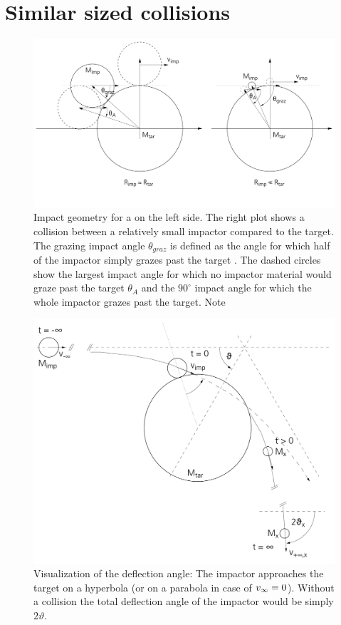 \newpage
\chapter{Similar sized collisions}
\graphicspath{{./03figs/}}


\begin{figure}[htbp]
\begin{center}
\includegraphics[scale=0.4]{03_grazing}
\caption{Impact geometry for a \SSC on the left side. The right plot shows a collision between a relatively small impactor compared to the target. The grazing impact angle $\theta_{graz}$ is defined as the angle for which half of the impactor simply grazes past the target \citep{Asphaug:2010p3539}. The dashed circles show the largest impact angle for which no impactor material would graze past the target $\theta_A$ and the $90^\circ$ impact angle for which the whole impactor grazes past the target. Note }
\label{ch03_fig01}
\end{center}
\end{figure}


\begin{figure}[htbp]
\begin{center}
\includegraphics[scale=0.5]{04_vartheta}
\caption{Visualization of the deflection angle: The impactor approaches the target on a hyperbola (or on a parabola in case of $v_{\infty} = 0$). Without a collision the total deflection angle of the impactor would be simply $2 \vartheta$.}
\label{ch03_fig02}
\end{center}
\end{figure}

